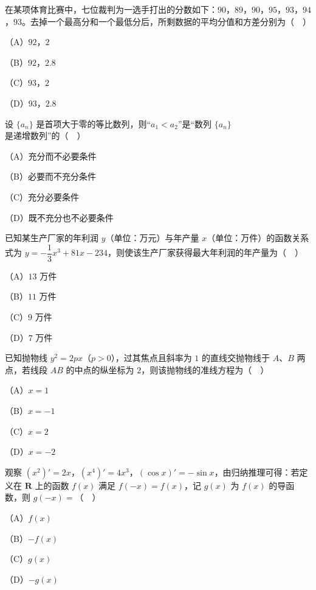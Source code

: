 \begin{question}
在某项体育比赛中，七位裁判为一选手打出的分数如下：$90$，$89$，$90$，$95$，$93$，$94$，$93$。去掉一个最高分和一个最低分后，所剩数据的平均分值和方差分别为（　）

（A）$92$，$2$

（B）$92$，$2.8$

（C）$93$，$2$

（D）$93$，$2.8$

\end{question}
\begin{question}
设 $\{a_n\}$ 是首项大于零的等比数列，则“$a_1<a_2$”是“数列 $\{a_n\}$ 是递增数列”的（　）

（A）充分而不必要条件

（B）必要而不充分条件

（C）充分必要条件

（D）既不充分也不必要条件

\end{question}
\begin{question}
已知某生产厂家的年利润 $y$（单位：万元）与年产量 $x$（单位：万件）的函数关系式为 $y=-\dfrac13x^3+81x-234$，则使该生产厂家获得最大年利润的年产量为（　）

（A）$13$ 万件

（B）$11$ 万件

（C）$9$ 万件

（D）$7$ 万件

\end{question}
\begin{question}
已知抛物线 $y^2=2px$（$p>0$），过其焦点且斜率为 $1$ 的直线交抛物线于 $A$、$B$ 两点，若线段 $AB$ 的中点的纵坐标为 $2$，则该抛物线的准线方程为（　）

（A）$x=1$

（B）$x=-1$

（C）$x=2$

（D）$x=-2$

\end{question}
\begin{question}
观察 $(x^2)'=2x$，$(x^4)'=4x^3$，$(\cos x)'=-\sin x$，由归纳推理可得：若定义在 $\mathbf R$ 上的函数 $f(x)$ 满足 $f(-x)=f(x)$，记 $g(x)$ 为 $f(x)$ 的导函数，则 $g(-x)=$（　）

（A）$f(x)$

（B）$-f(x)$

（C）$g(x)$

（D）$-g(x)$

\Needspace{0.4\textheight}
\end{question}
